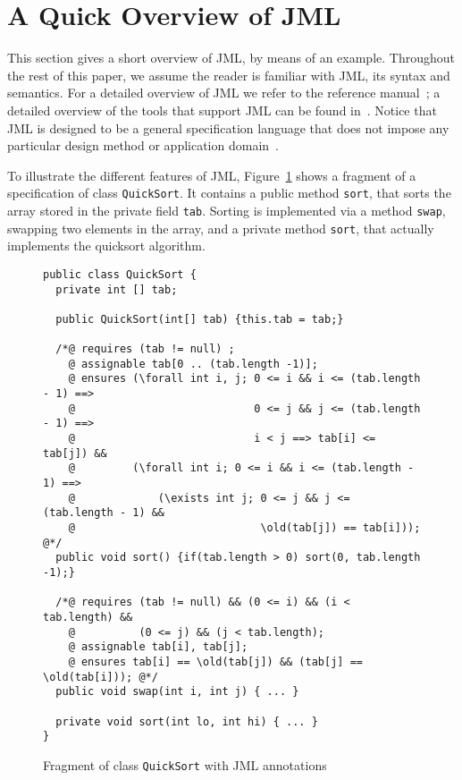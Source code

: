 \section{A Quick Overview of JML}\label{SecJML}



This section gives a short overview of JML, by means of an
example. Throughout the rest of this paper, we assume the reader is
familiar with JML, its syntax and semantics. For a detailed overview
of JML we refer to the reference manual~\cite{LeavensPCCRCK05}; a
detailed overview of the tools that support JML can be found
in~\cite{BurdyCCEKLLP03}.  Notice that JML is designed to be a general
specification language that does not impose any particular design
method or application domain~\cite{LeavensBR06}.



To illustrate the different features of JML, Figure~\ref{FigJMLSpec}
shows a fragment of a specification of class
\texttt{QuickSort}. It contains a public method
\texttt{sort}, that sorts the array stored in the private field
\texttt{tab}. Sorting is implemented via  a method \texttt{swap},
swapping two elements in the array, and a private method
\texttt{sort}, that actually implements the quicksort algorithm.

\begin{figure}[t!]
{\small
\begin{verbatim}
public class QuickSort {
  private int [] tab;

  public QuickSort(int[] tab) {this.tab = tab;}

  /*@ requires (tab != null) ;
    @ assignable tab[0 .. (tab.length -1)];
    @ ensures (\forall int i, j; 0 <= i && i <= (tab.length - 1) ==> 
    @                            0 <= j && j <= (tab.length - 1) ==>
    @                            i < j ==> tab[i] <= tab[j]) &&
    @         (\forall int i; 0 <= i && i <= (tab.length - 1) ==> 
    @             (\exists int j; 0 <= j && j <= (tab.length - 1) && 
    @                             \old(tab[j]) == tab[i])); @*/
  public void sort() {if(tab.length > 0) sort(0, tab.length -1);}

  /*@ requires (tab != null) && (0 <= i) && (i < tab.length) && 
    @          (0 <= j) && (j < tab.length);
    @ assignable tab[i], tab[j];
    @ ensures tab[i] == \old(tab[j]) && (tab[j] == \old(tab[i])); @*/
  public void swap(int i, int j) { ... }

  private void sort(int lo, int hi) { ... }
}
\end{verbatim}
}
\vspace*{-1em}\caption{Fragment of class \texttt{QuickSort} with JML annotations} 
\label{FigJMLSpec}
\end{figure}



